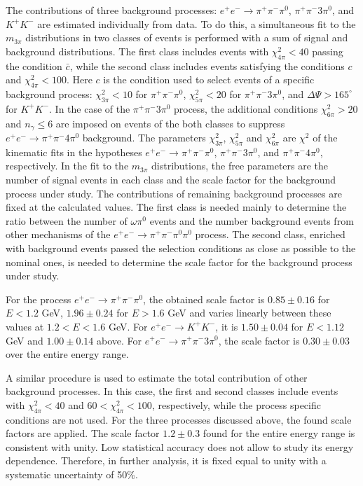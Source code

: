 \documentclass[twocolumn,aps,prd,floatfix,nofootinbib,superscriptaddress]{revtex4-2}
\begin{document}
The contributions of three background processes: \( e^+e^- \to \pi^+\pi^-\pi^0 \), $\pi^+\pi^-3\pi^0$, and $K^+ K^-$ are estimated individually from data.
To do this, a simultaneous fit to the $m_{3\pi}$ distributions in two classes of events is performed with a sum of signal and background distributions.
The first class includes events with \( \chi^2_{4\pi} < 40 \) passing the condition $\bar{c}$, while the second class includes events satisfying the conditions $c$ and \( \chi^2_{4\pi} < 100 \).
Here $c$ is the condition used to select events of a specific background process: \( \chi^2_{3\pi} < 10 \) for $\pi^+\pi^-\pi^0$, \( \chi^2_{5\pi} < 20 \) for $\pi^+\pi ^-3\pi^0$, and \( \Delta\Psi > 165^\circ \) for $K^+K^-$.
In the case of the $\pi^+\pi^-3\pi^0$ process, the additional conditions \( \chi^2_{6\pi} > 20 \) and \( n_\gamma \leq 6 \) are imposed on events of the both classes to suppress \( e^+e^- \to \pi^+\pi^-4\pi^0 \) background.
The parameters $\chi^2_{3\pi}$, $\chi^2_{5\pi}$ and $\chi^2_{6\pi}$ are $\chi^2$ of the kinematic fits in the hypotheses \( e^+e^- \to \pi^ +\pi^-\pi^0 \), \( \pi^+\pi^-3\pi^0 \), and \( \pi^+\pi^-4\pi^0 \), respectively.
In the fit to the $m_{3\pi}$ distributions, the free parameters are the number of signal events in each class and the scale factor for the background process under study.
The contributions of remaining background processes are fixed at the calculated values.
The first class is needed mainly to determine the ratio between the number of $\omega\pi^0$ events and the number background events from other mechanisms of the \( e^+e^- \to \pi^+\pi^-\pi^0\pi^0 \) process.
The second class, enriched with background events passed the selection conditions as close as possible to the nominal ones, is needed to determine the scale factor for the background process under study.

For the process \( e^+e^- \to \pi^+\pi^-\pi^0 \), the obtained scale factor is $0.85 \pm 0.16$ for $E<1.2$ GeV, $1.96 \pm 0.24$ for $E >1.6$ GeV and varies
linearly between these values at $1.2<E<1.6$ GeV.
For \( e^+e^- \to K^+K^- \), it is $1.50 \pm 0.04$ for $E<1.12$ GeV and $1.00 \pm 0.14$ above.
For \( e^+e^- \to \pi^+\pi^-3\pi^0 \), the scale factor is $0.30 \pm 0.03$ over the entire energy range.

A similar procedure is used to estimate the total contribution of other background processes.
In this case, the first and second classes include events with \( \chi^2_{4\pi} < 40 \) and \( 60 < \chi^2_{4\pi} < 100 \), respectively, while the process specific conditions are not used.
For the three processes discussed above, the found scale factors are applied.
The scale factor $1.2 \pm 0.3$ found for the entire energy range is consistent with unity.
Low statistical accuracy does not allow to study its energy dependence.
Therefore, in further analysis, it is fixed equal to unity with a systematic uncertainty of 50\%.
\end{document}
